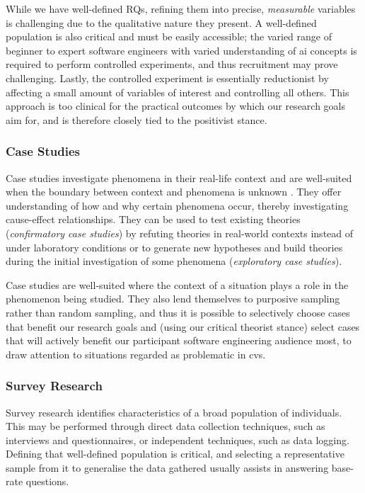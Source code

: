 While we have well-defined RQs, refining them into precise, \textit{measurable} variables is challenging due to the qualitative nature they present. A well-defined population is also critical and must be easily accessible; the varied range of beginner to expert software engineers with varied understanding of \gls{ai} concepts is required to perform controlled experiments, and thus recruitment may prove challenging. Lastly, the controlled experiment is essentially reductionist by affecting a small amount of variables of interest and controlling all others. This approach is too clinical for the practical outcomes by which our research goals aim for, and is therefore closely tied to the positivist stance.

\subsubsection{Case Studies}
Case studies investigate phenomena in their real-life context and are well-suited when the boundary between context and phenomena is unknown \citep{Yin:2017tf}. They offer understanding of how and why certain phenomena occur, thereby investigating cause-effect relationships. They can be used to test existing theories (\textit{confirmatory case studies}) by refuting theories in real-world contexts instead of under laboratory conditions or to generate new hypotheses and build theories during the initial investigation of some phenomena (\textit{exploratory case studies}).

Case studies are well-suited where the context of a situation plays a role in the phenomenon being studied. They also lend themselves to purposive sampling rather than random sampling, and thus it is possible to selectively choose cases that benefit our research goals and (using our critical theorist stance) select cases that will actively benefit our participant software engineering audience most, to draw attention to situations regarded as problematic in \gls{cvs}.

\subsubsection{Survey Research}
Survey research identifies characteristics of a broad population of individuals. This may be performed through direct data collection techniques, such as interviews and questionnaires, or independent techniques, such as data logging. Defining that well-defined population is critical, and selecting a representative sample from it to generalise the data gathered usually assists in answering base-rate questions.

